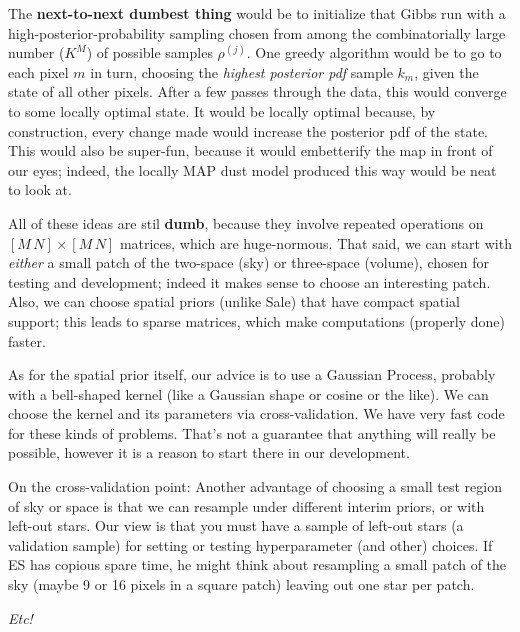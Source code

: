 \documentclass[12pt, letterpaper]{article}
\begin{document}
The \textbf{next-to-next dumbest thing} would be to initialize that Gibbs run
  with a high-posterior-probability sampling chosen from among the combinatorially large
  number ($K^M$) of possible samples $\rho^{(j)}$.
One greedy algorithm would be to go to each pixel $m$ in turn,
  choosing the \emph{highest posterior pdf} sample $k_m$,
  given the state of all other pixels.
After a few passes through the data, this would converge
  to some locally optimal state.
It would be locally optimal because, by construction,
  every change made would increase the posterior pdf of the state.
This would also be super-fun, because it would embetterify the map in front of our eyes;
  indeed, the locally MAP dust model produced this way would be neat to look at.

All of these ideas are stil \textbf{dumb},
  because they involve repeated operations on $[M\,N]\times[M\,N]$ matrices,
  which are huge-normous.
That said, we can start with \emph{either}
  a small patch of the two-space (sky) or three-space (volume),
  chosen for testing and development;
  indeed it makes sense to choose an interesting patch.
Also, we can choose spatial priors (unlike Sale)
  that have compact spatial support;
  this leads to sparse matrices,
  which make computations (properly done) faster.

As for the spatial prior itself,
  our advice is to use a Gaussian Process,
  probably with a bell-shaped kernel (like a Gaussian shape or cosine or the like).
We can choose the kernel and its parameters via cross-validation.
We have very fast code for these kinds of problems.
That's not a guarantee that anything will really be possible,
  however it is a reason to start there in our development.

On the cross-validation point:
Another advantage of choosing a small test region of sky or space
  is that we can resample under different interim priors,
  or with left-out stars.
Our view is that you must have a sample of left-out stars
  (a validation sample)
  for setting or testing hyperparameter (and other) choices.
If ES has copious spare time,
  he might think about resampling a small patch of the sky
  (maybe 9 or 16 pixels in a square patch)
  leaving out one star per patch.

\textsl{Etc!}
\end{document}

